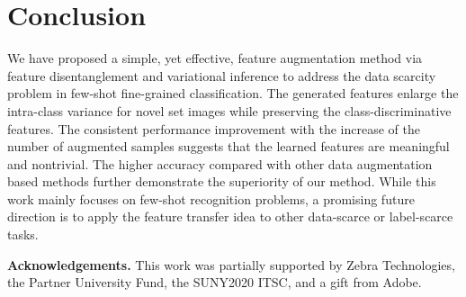 \documentclass[10pt,twocolumn,letterpaper]{article}
\begin{document}
\section{Conclusion} 
   We have proposed a simple, yet effective, feature augmentation method via feature disentanglement and variational inference  to address the data scarcity problem in few-shot fine-grained classification.
The generated features enlarge the intra-class variance for novel set images while preserving the class-discriminative features.
The consistent performance improvement with the increase of the number of augmented samples suggests that the learned features are meaningful and nontrivial.
The higher accuracy compared with other data augmentation based methods further demonstrate the superiority of our method.
While this work mainly focuses on few-shot recognition problems, a promising future direction is to apply the feature transfer idea to other data-scarce or label-scarce tasks.
     
\newcommand{\myheading}[1]{\vspace{1ex}\noindent \textbf{#1}}
\myheading{Acknowledgements.} 
This work was partially supported by Zebra Technologies, the Partner University Fund, the SUNY2020 ITSC, and a gift from Adobe. 

{\small


}
\end{document}
